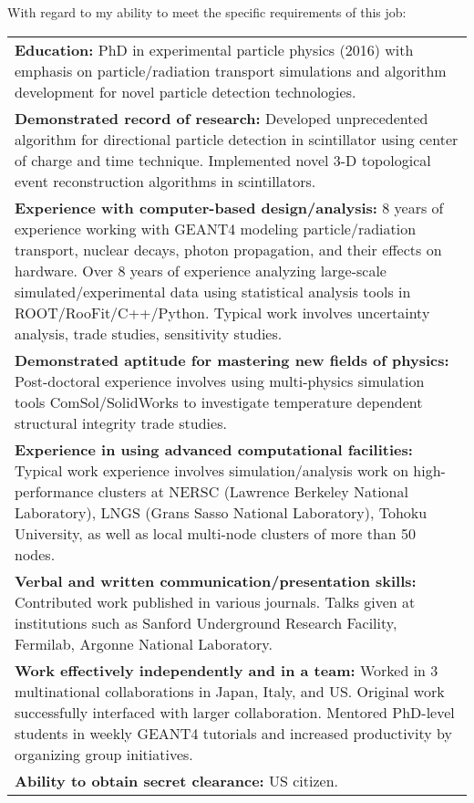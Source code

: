 \documentclass[11pt]{moderncv}        %
\begin{document}
With regard to my ability to meet the specific requirements of this job:
\noindent\begin{tabularx}{\linewidth}{@{{}\textbullet\enskip}X@{\quad}@{}}
	\textbf{Education:} PhD in experimental particle physics (2016) with
	emphasis on particle/radiation transport simulations and algorithm
	development for novel particle detection technologies.\\
	\textbf{Demonstrated record of research:} 
	Developed unprecedented algorithm for directional particle detection in
	scintillator using center of charge and time technique. Implemented novel
	3-D topological event reconstruction algorithms in scintillators.\\
	\textbf{Experience with computer-based design/analysis:} 8 years of
	experience working with GEANT4 modeling particle/radiation transport,
	nuclear decays, photon propagation, and their effects on hardware.
	Over 8 years of experience analyzing large-scale simulated/experimental
	data using statistical analysis tools in ROOT/RooFit/C++/Python. Typical
	work involves uncertainty analysis, trade studies, sensitivity studies.\\
	\textbf{Demonstrated aptitude for mastering new fields of physics:}
	Post-doctoral experience involves using multi-physics simulation tools
	ComSol/SolidWorks to investigate temperature dependent structural integrity
	trade studies.\\
	\textbf{Experience in using advanced computational facilities:} Typical
	work experience involves simulation/analysis work on high-performance
	clusters at NERSC (Lawrence Berkeley National Laboratory), LNGS (Grans
	Sasso National Laboratory), Tohoku University, as well as local multi-node
	clusters of more than 50 nodes.\\
	\textbf{Verbal and written communication/presentation skills:}
	Contributed work published in various journals. Talks given at institutions
	such as Sanford Underground Research Facility, Fermilab, Argonne National
	Laboratory.\\
	\textbf{Work effectively independently and in a team:} Worked in 3
	multinational collaborations in Japan, Italy, and US. Original work
	successfully interfaced with larger collaboration. Mentored PhD-level
	students in weekly GEANT4 tutorials and increased productivity by
	organizing group initiatives.\\
	\textbf{Ability to obtain secret clearance:} US citizen.\\
\end{tabularx}
\end{document}
